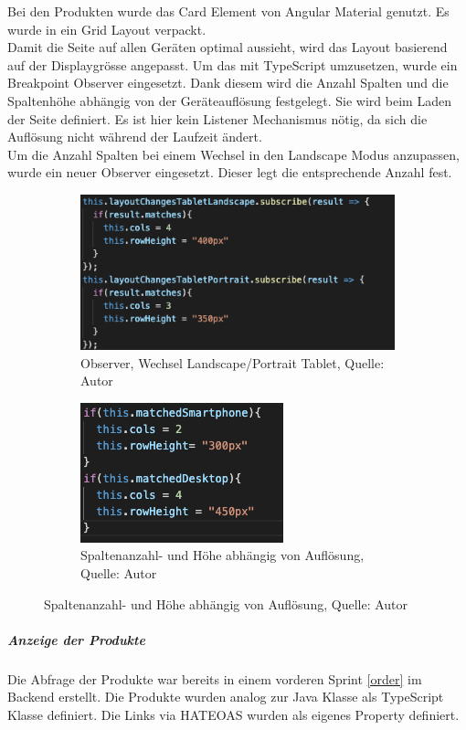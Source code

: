 Bei den Produkten wurde das Card Element von Angular Material genutzt. Es wurde in ein Grid Layout verpackt. \\Damit die Seite auf allen Geräten optimal aussieht, wird das Layout basierend auf der Displaygrösse angepasst. Um das mit TypeScript umzusetzen, wurde ein Breakpoint Observer eingesetzt. Dank diesem wird die Anzahl Spalten und die Spaltenhöhe abhängig von der Geräteauflösung festgelegt. Sie wird beim Laden der Seite definiert. Es ist hier kein Listener Mechanismus nötig, da sich die Auflösung nicht während der Laufzeit ändert.\\ Um die Anzahl Spalten bei einem Wechsel in den Landscape Modus anzupassen, wurde ein neuer Observer eingesetzt. Dieser legt die entsprechende Anzahl fest. 
\begin{figure}[H]
	\begin{subfigure}[b]{0.4\textwidth}
		\includegraphics[scale=0.4]{images/rowsLand.PNG}
		\caption[Observer, Wechsel Landscape/Portrait Tablet]{Observer, Wechsel Landscape/Portrait Tablet, Quelle: Autor}
		\label{img: Landscape observer}
	\end{subfigure}
	\hfill
	\begin{subfigure}[b]{0.4\textwidth}
		\includegraphics[scale=0.6]{images/rowsRes.PNG}
		\caption[Spaltenanzahl- und Höhe abhängig von Auflösung]{Spaltenanzahl- und Höhe abhängig von Auflösung, Quelle: Autor}
		\label{img: Resolution Observer}
	\end{subfigure}
\end{figure} 
\newpage
\subparagraph{Anzeige der Produkte}
Die Abfrage der Produkte war bereits in einem vorderen Sprint \ref{order} im Backend erstellt. Die Produkte wurden analog zur Java Klasse als TypeScript Klasse definiert. Die Links via \ac{HATEOAS} wurden als eigenes Property definiert. 

